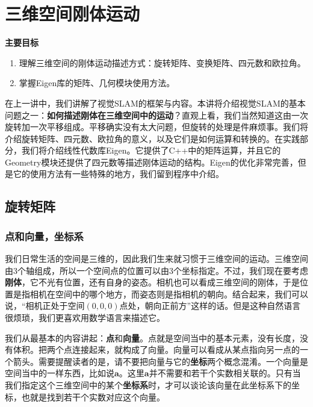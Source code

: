 \chapter{三维空间刚体运动}
\label{cpt:3}
\begin{mdframed}  
	\textbf{主要目标}
	\begin{enumerate}[labelindent=0em,leftmargin=1.5em]
		\item 理解三维空间的刚体运动描述方式：旋转矩阵、变换矩阵、四元数和欧拉角。
		\item 掌握Eigen库的矩阵、几何模块使用方法。
	\end{enumerate}
\end{mdframed} 

在上一讲中，我们讲解了视觉SLAM的框架与内容。本讲将介绍视觉SLAM的基本问题之一：\textbf{如何描述刚体在三维空间中的运动}？直观上看，我们当然知道这由一次旋转加一次平移组成。平移确实没有太大问题，但旋转的处理是件麻烦事。我们将介绍旋转矩阵、四元数、欧拉角的意义，以及它们是如何运算和转换的。在实践部分，我们将介绍线性代数库Eigen。它提供了C++中的矩阵运算，并且它的Geometry模块还提供了四元数等描述刚体运动的结构。Eigen的优化非常完善，但是它的使用方法有一些特殊的地方，我们留到程序中介绍。

\newpage


\newpage

\section{旋转矩阵}
\label{sec:rigidMotion}
\subsection{点和向量，坐标系}
我们日常生活的空间是三维的，因此我们生来就习惯于三维空间的运动。三维空间由3个轴组成，所以一个空间点的位置可以由3个坐标指定。不过，我们现在要考虑\textbf{刚体}，它不光有位置，还有自身的姿态。相机也可以看成三维空间的刚体，于是位置是指相机在空间中的哪个地方，而姿态则是指相机的朝向。结合起来，我们可以说，“相机正处于空间$(0,0,0)$点处，朝向正前方”这样的话。但是这种自然语言很烦琐，我们更喜欢用数学语言来描述它。

我们从最基本的内容讲起：\textbf{点}和\textbf{向量}。点就是空间当中的基本元素，没有长度，没有体积。把两个点连接起来，就构成了向量。向量可以看成从某点指向另一点的一个箭头。需要提醒读者的是，请不要把向量与它的\textbf{坐标}两个概念混淆。一个向量是空间当中的一样东西，比如说$\bm{a}$。这里$\bm{a}$并不需要和若干个实数相关联的。只有当我们指定这个三维空间中的某个\textbf{坐标系}时，才可以谈论该向量在此坐标系下的坐标，也就是找到若干个实数对应这个向量。

